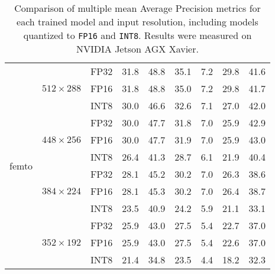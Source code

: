 \begin{appendices}
\begin{table}[t]
\begin{threeparttable}
\begin{tabular}{|c|c|c|rrrrrr|}
            \hline
            \multirow{12}{*}{femto}     & \multirow{3}{*}{$512\times288$}  & FP32 & 31.8 & 48.8 & 35.1 &  7.2 & 29.8 & 41.6 \\
                                        &                                  & FP16 & 31.8 & 48.8 & 35.0 &  7.2 & 29.8 & 41.7 \\
                                        &                                  & INT8 & 30.0 & 46.6 & 32.6 &  7.1 & 27.0 & 42.0 \\
            \cline{2-9}
                                        & \multirow{3}{*}{$448\times256$}  & FP32 & 30.0 & 47.7 & 31.8 &  7.0 & 25.9 & 42.9 \\
                                        &                                  & FP16 & 30.0 & 47.7 & 31.9 &  7.0 & 25.9 & 43.0 \\
                                        &                                  & INT8 & 26.4 & 41.3 & 28.7 &  6.1 & 21.9 & 40.4 \\
            \cline{2-9}
                                        & \multirow{3}{*}{$384\times224$}  & FP32 & 28.1 & 45.2 & 30.2 &  7.0 & 26.3 & 38.6 \\
                                        &                                  & FP16 & 28.1 & 45.3 & 30.2 &  7.0 & 26.4 & 38.7 \\
                                        &                                  & INT8 & 23.5 & 40.9 & 24.2 &  5.9 & 21.1 & 33.1 \\
            \cline{2-9}
                                        & \multirow{3}{*}{$352\times192$}  & FP32 & 25.9 & 43.0 & 27.5 &  5.4 & 22.7 & 37.0 \\
                                        &                                  & FP16 & 25.9 & 43.0 & 27.5 &  5.4 & 22.6 & 37.0 \\
                                        &                                  & INT8 & 21.4 & 34.8 & 23.5 &  4.4 & 18.2 & 32.3 \\
            \hline
        \end{tabular}
        \caption{Comparison of multiple mean Average Precision metrics for each
        trained model and input resolution, including models quantized to
        \texttt{FP16} and \texttt{INT8}. Results were measured on NVIDIA Jetson AGX
        Xavier.}
        \label{mAPTableBigFig}
    \end{threeparttable}
    \normalsize
\end{table}







\end{appendices}

% 